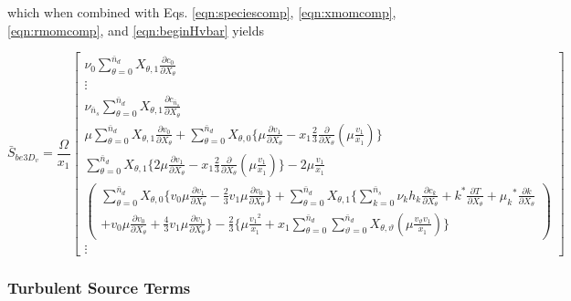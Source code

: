 	which when combined with Eqs. \ref{eqn:speciescomp}, \ref{eqn:xmomcomp}, \ref{eqn:rmomcomp}, 
and \ref{eqn:beginHvbar} yields 

\begin{displaymath}
	\bar{S}_{be3D_v} = \frac{\Omega}{x_1}\left[ \begin{array}{c}
		\nu_0 \sum_{\theta = 0}^{\bar{n}_d}X_{\theta,1} 
		\frac{\partial c_0}{\partial X_\theta} \\
		\vdots \\
		\nu_{\bar{n}_s} \sum_{\theta = 0}^{\bar{n}_d}X_{\theta,1} 
		\frac{\partial c_{\bar{n}_s}}{\partial X_\theta} 
		\\
		\mu \sum_{\theta = 0}^{\bar{n}_d} X_{\theta,1}\frac{\partial v_0}{\partial X_\theta}
		+ \sum_{\theta = 0}^{\bar{n}_d} X_{\theta,0} \Big\{\mu \frac{\partial v_1}{\partial X_\theta} 
		- x_1 \frac{2}{3} \frac{\partial}{\partial X_\theta}(\mu \frac{v_1}{x_1}) \Big\} 
		\\
		\sum_{\theta = 0}^{\bar{n}_d}X_{\theta,1}\Big\{2\mu\frac{\partial v_1}{\partial X_\theta} 
		-x_1\frac{2}{3}\frac{\partial}{\partial X_\theta}(\mu\frac{v_1}{x_1})\Big\} - 2\mu\frac{v_1}{x_1} 
		\\
	\left(\begin{array}{c}
		\sum_{\theta = 0}^{\bar{n}_d}X_{\theta,0} \Big\{v_0\mu\frac{\partial v_1}{\partial X_\theta} -\frac{2}{3}
		v_1\mu\frac{\partial v_0}{\partial X_\theta} \Big\} + \sum_{\theta = 0}^{\bar{n}_d}X_{\theta,1}\Big\{
		\sum_{k = 0}^{\bar{n}_s}\nu_k h_k \frac{\partial c_k}{\partial X_\theta} + 
		k^*\frac{\partial T}{\partial X_\theta} + {\mu_k}^*\frac{\partial k}{\partial X_\theta} \\ 
		+ v_0 \mu \frac{\partial v_0}{\partial X_\theta} + \frac{4}{3}v_1 \mu \frac{\partial v_1}{\partial X_\theta}
		\Big\} -\frac{2}{3}\Big\{\mu\frac{{v_1}^2}{x_1} + x_1\sum_{\theta = 0}^{\bar{n}_d}\sum_{\vartheta = 0}^{\bar{n}_d}
		X_{\theta,\vartheta}(\mu\frac{v_\vartheta v_1}{x_1})\Big\}
	\end{array}\right)
		\\	
		\vdots
		   \end{array}
	    \right]
\end{displaymath}

\subsubsection{Turbulent Source Terms}


